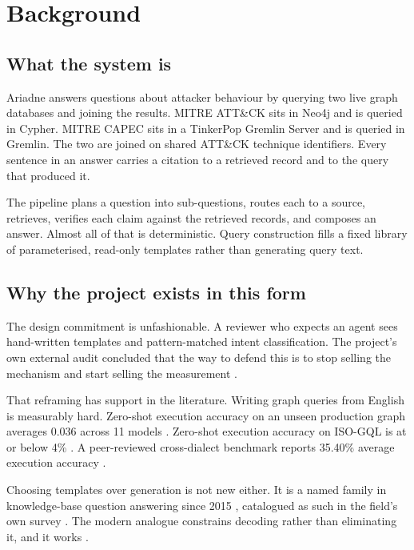 \section{Background}

\subsection{What the system is}

Ariadne answers questions about attacker behaviour by querying two live graph
databases and joining the results. MITRE ATT\&CK sits in Neo4j and is queried in
Cypher. MITRE CAPEC sits in a TinkerPop Gremlin Server and is queried in
Gremlin. The two are joined on shared ATT\&CK technique identifiers. Every
sentence in an answer carries a citation to a retrieved record and to the query
that produced it.

The pipeline plans a question into sub-questions, routes each to a source,
retrieves, verifies each claim against the retrieved records, and composes an
answer. Almost all of that is deterministic. Query construction fills a fixed
library of parameterised, read-only templates rather than generating query text.

\subsection{Why the project exists in this form}

The design commitment is unfashionable. A reviewer who expects an agent sees
hand-written templates and pattern-matched intent classification. The project's
own external audit concluded that the way to defend this is to stop selling the
mechanism and start selling the measurement \citep{audit2026}.

That reframing has support in the literature. Writing graph queries from English
is measurably hard. Zero-shot execution accuracy on an unseen production graph
averages 0.036 across 11 models \citep{pipecypher}. Zero-shot execution accuracy
on ISO-GQL is at or below 4\% \citep{text2gql}. A peer-reviewed cross-dialect
benchmark reports 35.40\% average execution accuracy \citep{gqlbench}.

Choosing templates over generation is not new either. It is a named family in
knowledge-base question answering since 2015 \citep{aqqu, tqa}, catalogued as
such in the field's own survey \citep{kbqasurvey}. The modern analogue
constrains decoding rather than eliminating it, and it works \citep{picard}.

